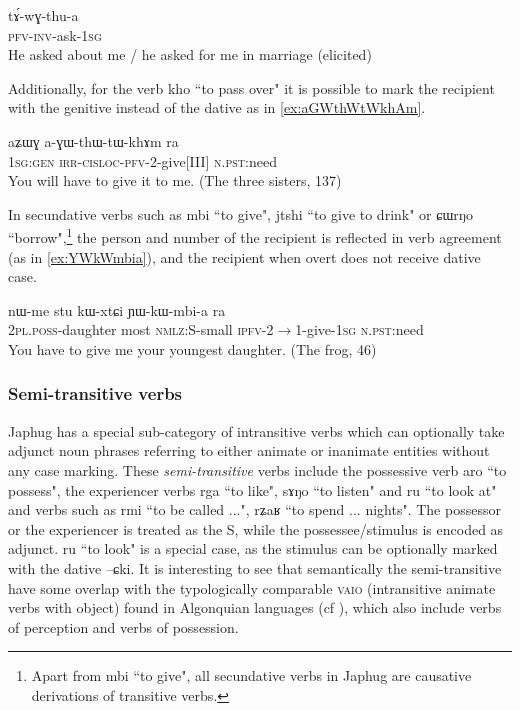 \documentclass[oldfontcommands,oneside,a4paper,11pt]{article}
\newcommand{\ipa}[1]{{\phon #1}} %
\begin{document}
 \begin{exe}
   \ex   \label{ex:tAGwthua}
 \gll
\ipa{tɤ́-wɣ-thu-a} \\
\textsc{pfv-inv}-ask-\textsc{1sg}\\
\glt He asked about me / he asked for me in marriage (elicited)   
      \end{exe}  
      
   Additionally, for the verb \ipa{kho} ``to pass over" it is possible to mark the recipient with the genitive instead of the dative as in \ref{ex:aGWthWtWkhAm}.
 \begin{exe}
   \ex   \label{ex:aGWthWtWkhAm}
 \gll
\ipa{aʑɯɣ}  	\ipa{a-ɣɯ-thɯ-tɯ-khɤm}  	\ipa{ra}  \\
\textsc{1sg:gen} \textsc{irr-cisloc-pfv}-2-give[III] \textsc{n.pst}:need \\
\glt You will have to give it to me. (The three sisters, 137)
   \end{exe}  


In secundative verbs such as \ipa{mbi} ``to give", \ipa{jtshi} ``to give to drink" or \ipa{ɕɯrŋo} ``borrow",\footnote{Apart from \ipa{mbi} ``to give", all secundative verbs in Japhug are causative derivations of transitive verbs.} the person and number of the recipient is reflected in verb agreement (as in \ref{ex:YWkWmbia}), and the recipient when overt does not receive dative case.


 \begin{exe}
   \ex   \label{ex:YWkWmbia}
 \gll 
\ipa{nɯ-me}  	\ipa{stu}  	\ipa{kɯ-xtɕi}  	\ipa{ɲɯ-kɯ-mbi-a}  	\ipa{ra}  \\
\textsc{2pl.poss}-daughter most \textsc{nmlz}:S-small \textsc{ipfv}-2$\rightarrow$1-give-\textsc{1sg} \textsc{n.pst}:need \\
\glt You have to give me your youngest daughter.  (The frog, 46)
   \end{exe}  

   
   
\subsubsection{Semi-transitive verbs} \label{sec:semi.tr}
  Japhug has a special sub-category of intransitive verbs which can optionally take adjunct noun phrases referring to either animate or inanimate entities without any case marking.   These  \textit{semi-transitive} verbs   include the possessive verb \ipa{aro} ``to possess", the experiencer verbs \ipa{rga} ``to like", \ipa{sɤŋo} ``to listen" and \ipa{ru} ``to look at" and verbs such as \ipa{rmi} ``to be called ...", \ipa{rʑaʁ} ``to spend ... nights". The possessor or the experiencer is treated as the S, while the possessee/stimulus is encoded as adjunct. \ipa{ru} ``to look" is a special case, as the stimulus can be optionally marked with the dative \ipa{--ɕki}. It is interesting to see that semantically the semi-transitive have some overlap with the typologically  comparable \textsc{vaio} (intransitive animate verbs with object) found in Algonquian languages (cf  \citealt[242]{valentine01grammar}), which also include verbs of perception and verbs of possession.
\end{document}

